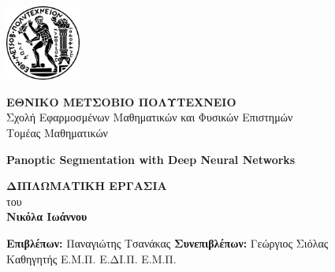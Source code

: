 \documentclass[12pt]{article}
\numberwithin{equation}{section}
\begin{document}
\thispagestyle{empty}
\begin{center}
    \includegraphics[width=0.185\textwidth]{images/ntua_logo.png} \\ %
    \noindent\rule{0pt}{1.5em}


    \textbf{\Large ΕΘΝΙΚΟ ΜΕΤΣΟΒΙΟ ΠΟΛΥΤΕΧΝΕΙΟ} \\[0.5em]
    Σχολή Εφαρμοσμένων Μαθηματικών και Φυσικών Επιστημών \\[0.5em]
    Τομέας Μαθηματικών \\[3em]

\vspace{1.9cm} 

    {
    
    \textbf{\Large Panoptic Segmentation with Deep Neural Networks} \\[2em]
    }

    \textbf{\LARGE ΔΙΠΛΩΜΑΤΙΚΗ ΕΡΓΑΣΙΑ} \\[1.5em]

    του \\
    \textbf{Νικόλα Ιωάννου} \\[4em]

\vspace{1.8cm} 


\hspace*{-0.3cm}\textbf{Επιβλέπων:} Παναγιώτης Τσανάκας       \hspace*{3.65cm} \textbf{Συνεπιβλέπων:} Γεώργιος Σιόλας \\
\hspace*{1.76cm}Καθηγητής Ε.Μ.Π.  \hspace*{7.23cm}Ε.ΔΙ.Π. Ε.Μ.Π.

\vspace{5.5 cm} 






 \\
\end{center}
\newpage
\mbox{}
\newpage
\end{document}

